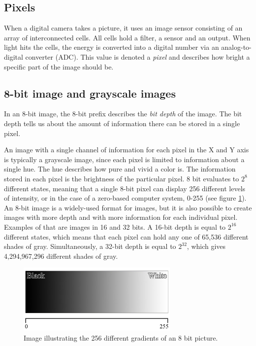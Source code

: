 \subsection{Pixels}
When a digital camera takes a picture, it uses an image sensor consisting of an array of interconnected cells. All cells hold a filter, a sensor and an output. When light hits the cells, the energy is converted into a digital number via an analog-to-digital converter (ADC). This value is denoted a \textit{pixel} and describes how bright a specific part of the image should be. \citep{ip_book}

\subsection{8-bit image and grayscale images}
In an 8-bit image, the 8-bit prefix describes the \textit{bit depth} of the image. The bit depth tells us about the amount of information there can be stored in a single pixel.

An image with a single channel of information for each pixel in the X and Y axis is typically a grayscale image, since each pixel is limited to information about a single hue. The hue describes how pure and vivid a color is. \citep{visual_story} The information stored in each pixel is the brightness of the particular pixel. 8 bit evaluates to $2^8$ different states, meaning that a single 8-bit pixel can display 256 different levels of intensity, or in the case of a zero-based computer system, 0-255 (see figure \ref{fig:ip_grayscale}). An 8-bit image is a widely-used format for images, but it is also possible to create images with more depth and with more information for each individual pixel. Examples of that are images in 16 and 32 bits. A 16-bit depth is equal to $2^{16}$ different states, which means that each pixel can hold any one of 65,536 different shades of gray. Simultaneously, a 32-bit depth is equal to $2^{32}$, which gives 4,294,967,296 different shades of gray.

\begin{figure}[htbp]
\centering
\includegraphics[width=0.7\textwidth]{Pictures/Theory/Grayscale.jpg}
\caption{Image illustrating the 256 different gradients of an 8 bit picture.}
\label{fig:ip_grayscale}
\end{figure}
 
